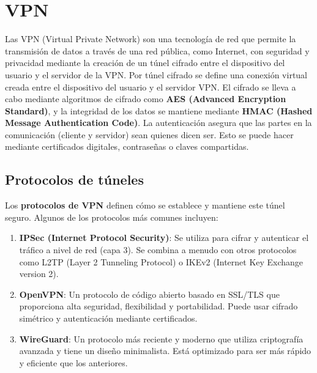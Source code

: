 \section{VPN} %
Las VPN (Virtual Private Network) son una tecnología de red que permite la transmisión de datos a través de una red pública, como Internet, con seguridad y privacidad mediante la creación de un túnel cifrado entre el dispositivo del usuario y el servidor de la VPN. Por túnel cifrado se define una conexión virtual creada entre el dispositivo del usuario y el servidor VPN. El cifrado se lleva a cabo mediante algoritmos de cifrado como \textbf{AES (Advanced Encryption Standard)}, y la integridad de los datos se mantiene mediante \textbf{HMAC (Hashed Message Authentication Code)}. La autenticación asegura que las partes en la comunicación (cliente y servidor) sean quienes dicen ser. Esto se puede hacer mediante certificados digitales, contraseñas o claves compartidas.

\subsection{Protocolos de túneles}

Los \textbf{protocolos de VPN} definen cómo se establece y mantiene este túnel seguro. Algunos de los protocolos más comunes incluyen:
\begin{enumerate}
   \item \textbf{IPSec (Internet Protocol Security)}: Se utiliza para cifrar y autenticar el tráfico a nivel de red (capa 3). Se combina a menudo con otros protocolos como L2TP (Layer 2 Tunneling Protocol) o IKEv2 (Internet Key Exchange version 2).
   \item \textbf{OpenVPN}: Un protocolo de código abierto basado en SSL/TLS que proporciona alta seguridad, flexibilidad y portabilidad. Puede usar cifrado simétrico y autenticación mediante certificados.
   
   \item \textbf{WireGuard}: Un protocolo más reciente y moderno que utiliza criptografía avanzada y tiene un diseño minimalista. Está optimizado para ser más rápido y eficiente que los anteriores.
\end{enumerate}

